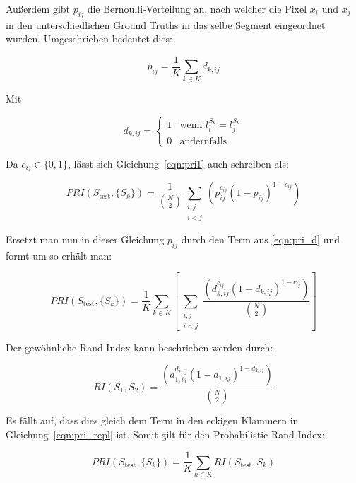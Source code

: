 Außerdem gibt $p_{ij}$ die Bernoulli-Verteilung an, nach welcher die Pixel $x_i$ und $x_j$ in den unterschiedlichen Ground Truths in das selbe Segment eingeordnet wurden. Umgeschrieben bedeutet dies:

\begin{equation}
p_{ij} = \frac{1}{K}\sum_{k\in K}d_{k, ij}
\end{equation}

Mit

\begin{equation}
\label{eqn:pri_d}
d_{k, ij} = \begin{cases}
1 & \text{wenn } l_i^{S_k}=l_j^{S_k}\\
0 & \text{andernfalls}
\end{cases}
\end{equation}

Da $c_{ij}\in\{0,1\}$, lässt sich Gleichung~\ref{eqn:pri1} auch schreiben als: \cite{pantofaru_07}

\begin{equation}
PRI(S_\text{test}, \{S_k\}) = \frac{1}{\binom{N}{2}} \sum_{\substack{i,j\\i<j}} \left(p_{ij}^{c_{ij}}\left(1-p_{ij}\right)^{1-c_{ij}}\right)
\end{equation}

Ersetzt man nun in dieser Gleichung $p_{ij}$ durch den Term aus \ref{eqn:pri_d} und formt um so erhält man:

\begin{equation}
\label{eqn:pri_repl}
PRI(S_\text{test}, \{S_k\}) = \frac{1}{K}\sum_{k\in K}\left[ \sum_{\substack{i,j\\i<j}}\frac{\left(d_{k,ij}^{c_{ij}}\left(1-d_{k,ij}\right)^{1-c_{ij}}\right)}{\binom{N}{2}}\right]
\end{equation}

Der gewöhnliche Rand Index kann beschrieben werden durch:

\begin{equation}
RI(S_1, S_2) = \frac{\left(d_{1,ij}^{d_{2,ij}}\left(1-d_{1,ij}\right)^{1-d_{2,ij}}\right)}{\binom{N}{2}}
\end{equation}

Es fällt auf, dass dies gleich dem Term in den eckigen Klammern in Gleichung~\ref{eqn:pri_repl} ist. Somit gilt für den Probabilistic Rand Index:

\begin{equation}
PRI(S_\text{test}, \{S_k\}) = \frac{1}{K}\sum_{k\in K}RI(S_\text{test}, S_k)
\end{equation}

